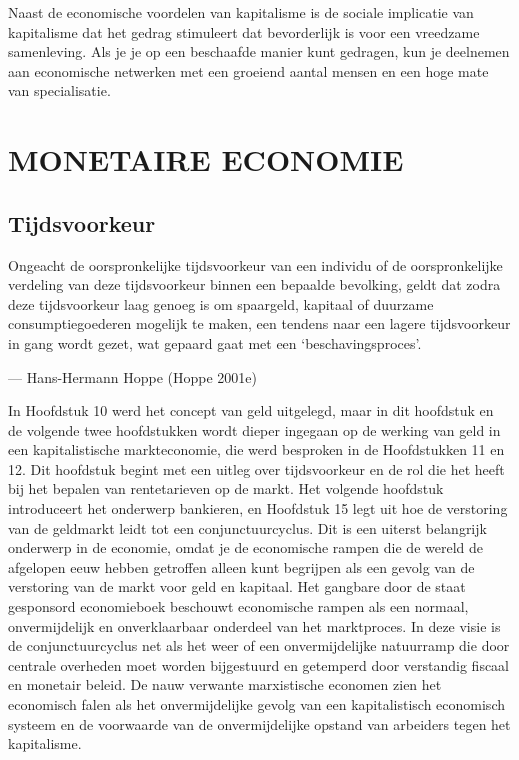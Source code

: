 \documentclass[
  a5paper,
  smalldemyvopaper,11pt,twoside,onecolumn,openright,extrafontsizes,
hidelinks]{memoir}
\begin{document}
Naast de economische voordelen van kapitalisme is de sociale implicatie
van kapitalisme dat het gedrag stimuleert dat bevorderlijk is voor een
vreedzame samenleving. Als je je op een beschaafde manier kunt gedragen,
kun je deelnemen aan economische netwerken met een groeiend aantal
mensen en een hoge mate van specialisatie.

\part{MONETAIRE ECONOMIE}

\chapter{Tijdsvoorkeur}\label{sec-tijdsvoorkeur}

Ongeacht de oorspronkelijke tijdsvoorkeur van een individu of de
oorspronkelijke verdeling van deze tijdsvoorkeur binnen een bepaalde
bevolking, geldt dat zodra deze tijdsvoorkeur laag genoeg is om
spaargeld, kapitaal of duurzame consumptiegoederen mogelijk te maken,
een tendens naar een lagere tijdsvoorkeur in gang wordt gezet, wat
gepaard gaat met een `beschavingsproces'.

--- Hans-Hermann Hoppe (Hoppe 2001e)

In Hoofdstuk 10 werd het concept van geld uitgelegd, maar in dit
hoofdstuk en de volgende twee hoofdstukken wordt dieper ingegaan op de
werking van geld in een kapitalistische markteconomie, die werd
besproken in de Hoofdstukken 11 en 12. Dit hoofdstuk begint met een
uitleg over tijdsvoorkeur en de rol die het heeft bij het bepalen van
rentetarieven op de markt. Het volgende hoofdstuk introduceert het
onderwerp bankieren, en Hoofdstuk 15 legt uit hoe de verstoring van de
geldmarkt leidt tot een conjunctuurcyclus. Dit is een uiterst belangrijk
onderwerp in de economie, omdat je de economische rampen die de wereld
de afgelopen eeuw hebben getroffen alleen kunt begrijpen als een gevolg
van de verstoring van de markt voor geld en kapitaal. Het gangbare door
de staat gesponsord economieboek beschouwt economische rampen als een
normaal, onvermijdelijk en onverklaarbaar onderdeel van het marktproces.
In deze visie is de conjunctuurcyclus net als het weer of een
onvermijdelijke natuurramp die door centrale overheden moet worden
bijgestuurd en getemperd door verstandig fiscaal en monetair beleid. De
nauw verwante marxistische economen zien het economisch falen als het
onvermijdelijke gevolg van een kapitalistisch economisch systeem en de
voorwaarde van de onvermijdelijke opstand van arbeiders tegen het
kapitalisme.
\end{document}
